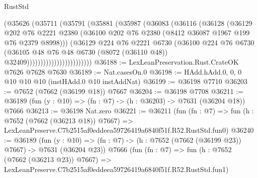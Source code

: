 \begin{lexlean}{RustStd}
\begin{coremodule}
                              (@35626
                                (@35711
                                  (@35791
                                    (@35881
                                      (@35987
                                        (@36083
                                          (@36116
                                            (@36128
                                              (@36129
                                                @202
                                                @76
                                                @2221
                                                @2380
                                                (@36100
                                                  @202
                                                  @76
                                                  @2380
                                                  (@8412 @36087 @1967 @199 @76 @2379 @8998)))
                                              (@36129
                                                @224
                                                @76
                                                @2221
                                                @6730
                                                (@36100
                                                  @224
                                                  @76
                                                  @6730
                                                  (@36105
                                                    @48
                                                    @76
                                                    @48
                                                    @6730
                                                    (@8072 (@36110 @48))
                                                    @32409))))))))))))))))))))))))
@36188 := LexLeanPreservation.Rust.CrateOK @7626 @7628 @7630
@36189 := Nat.casesOn.{0}
@36198 := HAdd.hAdd.{0, 0, 0} @10 @10 @10 (instHAdd.{0} @10 instAddNat)
@36199 := @36198 @7710
@36203 := @7652 (@7662 (@36199 @18)) @7667
@36204 := @36198 @7708
@36211 := @36189 (fun (y : @10) => (fn : @7) -> (h : @36203) -> @7631 (@36204 @18)) @7666
@36213 := @36198 Nat.zero
@36221 := @36211
    (fun (fn : @7) =>
    fun (h : @7652 (@7662 (@36213 @18)) @7667) =>
    LexLeanPreserve.C7b2515af0eddeea59726419a6840f51f.R52.RustStd.fun0)
@36240 := @36189
    (fun (y : @10) => (fn : @7) -> (h : @7652 (@7662 (@36199 @23)) @7667) -> @7631 (@36204 @23))
    @7666
    (fun (fn : @7) =>
    fun (h : @7652 (@7662 (@36213 @23)) @7667) =>
    LexLeanPreserve.C7b2515af0eddeea59726419a6840f51f.R52.RustStd.fun1)

\end{coremodule}
\end{lexlean}
